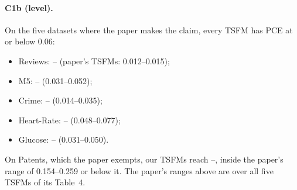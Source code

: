 \paragraph{C1b (level).} On the five datasets where the paper makes the claim, every TSFM has PCE at or below 0.06:
\begin{itemize}
\item Reviews: \minTSFMpceRev--\maxTSFMpceRev{} (paper's TSFMs: 0.012--0.015);
\item M5: \minTSFMpceMfive--\maxTSFMpceMfive{} (0.031--0.052);
\item Crime: \minTSFMpceCrime--\maxTSFMpceCrime{} (0.014--0.035);
\item Heart-Rate: \minTSFMpceHR--\maxTSFMpceHR{} (0.048--0.077);
\item Glucose: \minTSFMpceGlucose--\maxTSFMpceGlucose{} (0.031--0.050).
\end{itemize}
On Patents, which the paper exempts, our TSFMs reach \minTSFMpcePat--\maxTSFMpcePat, inside the paper's range of
0.154--0.259 or below it. The paper's ranges above are over all five TSFMs of its Table~4.

